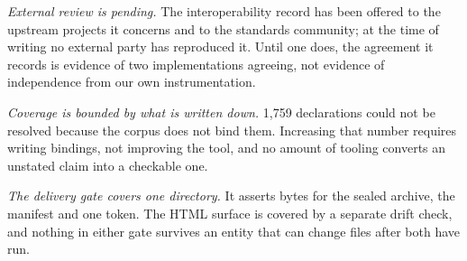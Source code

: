 \emph{External review is pending.} The interoperability record has been offered
to the upstream projects it concerns and to the standards community; at the time
of writing no external party has reproduced it. Until one does, the agreement it
records is evidence of two implementations agreeing, not evidence of
independence from our own instrumentation.

\emph{Coverage is bounded by what is written down.} 1{,}759 declarations could
not be resolved because the corpus does not bind them. Increasing that number
requires writing bindings, not improving the tool, and no amount of tooling
converts an unstated claim into a checkable one.

\emph{The delivery gate covers one directory.} It asserts bytes for the sealed
archive, the manifest and one token. The HTML surface is covered by a separate
drift check, and nothing in either gate survives an entity that can change files
after both have run.
